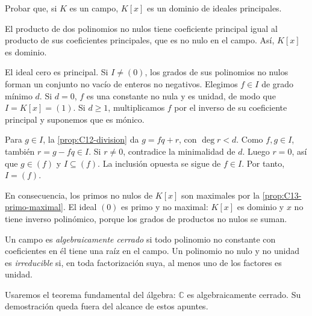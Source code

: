 \begin{ejer}\label{ejer:C13-Kx}
Probar que, si $K$ es un campo, $K[x]$ es un dominio de ideales principales.
\end{ejer}
\begin{sol}
El producto de dos polinomios no nulos tiene coeficiente principal igual al producto de sus coeficientes principales, que es no nulo en el campo. Así, $K[x]$ es dominio.

El ideal cero es principal. Si $I\ne(0)$, los grados de sus polinomios no nulos forman un conjunto no vacío de enteros no negativos. Elegimos $f\in I$ de grado mínimo $d$. Si $d=0$, $f$ es una constante no nula y es unidad, de modo que $I=K[x]=(1)$. Si $d\geq1$, multiplicamos $f$ por el inverso de su coeficiente principal y suponemos que es mónico.

Para $g\in I$, la \cref{prop:C12-division} da $g=fq+r$, con $\deg r<d$. Como $f,g\in I$, también $r=g-fq\in I$. Si $r\ne0$, contradice la minimalidad de $d$. Luego $r=0$, así que $g\in(f)$ y $I\subseteq(f)$. La inclusión opuesta se sigue de $f\in I$. Por tanto, $I=(f)$.
\end{sol}

En consecuencia, los primos no nulos de $K[x]$ son maximales por la \cref{prop:C13-primo-maximal}. El ideal $(0)$ es primo y no maximal: $K[x]$ es dominio y $x$ no tiene inverso polinómico, porque los grados de productos no nulos se suman.

\begin{defi}
Un campo es \emph{algebraicamente cerrado} si todo polinomio no constante con coeficientes en él tiene una raíz en el campo. Un polinomio no nulo y no unidad es \emph{irreducible} si, en toda factorización suya, al menos uno de los factores es unidad.
\end{defi}
Usaremos el teorema fundamental del álgebra: $\mathbb C$ es algebraicamente cerrado. Su demostración queda fuera del alcance de estos apuntes.

